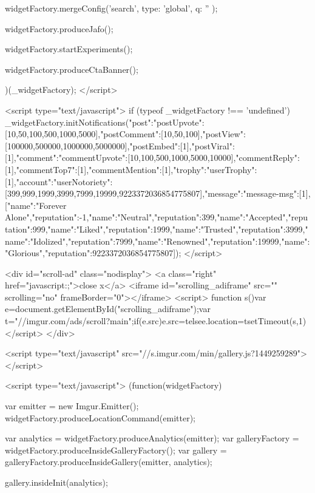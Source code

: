 {{{                widgetFactory.mergeConfig('search', {
                    type: 'global', 
                    q: ''
                });

                widgetFactory.produceJafo();

                widgetFactory.startExperiments();

                                    widgetFactory.produceCtaBanner();
                
            })(_widgetFactory);
        </script>
    

            <script type="text/javascript">
            if (typeof _widgetFactory !== 'undefined') {
                _widgetFactory.initNotifications({"post":{"postUpvote":[10,50,100,500,1000,5000],"postComment":[10,50,100],"postView":[100000,500000,1000000,5000000],"postEmbed":[1],"postViral":[1]},"comment":{"commentUpvote":[10,100,500,1000,5000,10000],"commentReply":[1],"commentTop7":[1],"commentMention":[1]},"trophy":{"userTrophy":[1]},"account":{"userNotoriety":[399,999,1999,3999,7999,19999,9223372036854775807]},"message":{"message-msg":[1]}}, [{"name":"Forever Alone","reputation":-1},{"name":"Neutral","reputation":399},{"name":"Accepted","reputation":999},{"name":"Liked","reputation":1999},{"name":"Trusted","reputation":3999},{"name":"Idolized","reputation":7999},{"name":"Renowned","reputation":19999},{"name":"Glorious","reputation":9223372036854775807}]);
            }
        </script>
    

                <div id="scroll-ad" class="nodisplay">
    <a class="right" href="javascript:;">close x</a>
    <iframe id="scrolling_adiframe" src="" scrolling="no" frameBorder="0"></iframe>
    <script>
        function s(){var e=document.getElementById("scrolling_adiframe");var t="//imgur.com/ads/scroll?main";if(e.src){e.src=t}else{e.location=t}}setTimeout(s,1)
    </script>
</div>
    

    <script type="text/javascript" src="//s.imgur.com/min/gallery.js?1449259289"></script>

    <script type="text/javascript">
    (function(widgetFactory) {
        var emitter = new Imgur.Emitter();
        widgetFactory.produceLocationCommand(emitter);

        var analytics = widgetFactory.produceAnalytics(emitter);
        var galleryFactory = widgetFactory.produceInsideGalleryFactory();
        var gallery = galleryFactory.produceInsideGallery(emitter, analytics);

        gallery.insideInit(analytics);
        
}}}
